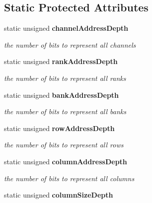 \subsection*{Static Protected Attributes}
\begin{CompactItemize}
\item 
static unsigned {\bf channelAddressDepth}\label{class_d_r_a_msim_i_i_1_1_address_11349fa1c0555dc4059318d4c93e7f43}

\begin{CompactList}\small\item\em the number of bits to represent all channels \item\end{CompactList}\item 
static unsigned {\bf rankAddressDepth}\label{class_d_r_a_msim_i_i_1_1_address_5b8470c0cb8af315691c90d2331dbc44}

\begin{CompactList}\small\item\em the number of bits to represent all ranks \item\end{CompactList}\item 
static unsigned {\bf bankAddressDepth}\label{class_d_r_a_msim_i_i_1_1_address_c99876d659041711c5918c81e4446d7a}

\begin{CompactList}\small\item\em the number of bits to represent all banks \item\end{CompactList}\item 
static unsigned {\bf rowAddressDepth}\label{class_d_r_a_msim_i_i_1_1_address_68909db0f9958d932a12b74ff98eb3cc}

\begin{CompactList}\small\item\em the number of bits to represent all rows \item\end{CompactList}\item 
static unsigned {\bf columnAddressDepth}\label{class_d_r_a_msim_i_i_1_1_address_a3bb010911eee8fba8b16dd40344b4c1}

\begin{CompactList}\small\item\em the number of bits to represent all columns \item\end{CompactList}\item 
static unsigned {\bf columnSizeDepth}\label{class_d_r_a_msim_i_i_1_1_address_6772f2ae61044ec8c7d554ff80b0463a}


\end{CompactItemize}
